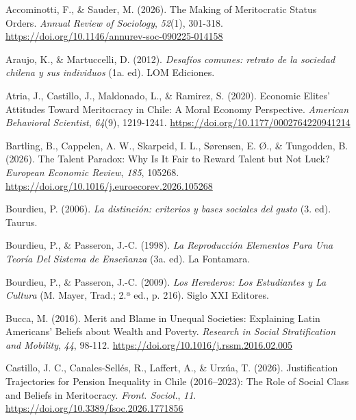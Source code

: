 \documentclass[
  spanish,
  a4paper,
  oneside]{scrbook}
\newlength{\cslhangindent}
\newenvironment{CSLReferences}[2] %
 {\begin{list}{}{%
  \setlength{\itemindent}{0pt}
  \setlength{\leftmargin}{0pt}
  \setlength{\parsep}{0pt}
  \ifodd #1
   \setlength{\leftmargin}{\cslhangindent}
   \setlength{\itemindent}{-1\cslhangindent}
  \fi
  \setlength{\itemsep}{#2\baselineskip}}}
 {\end{list}}
\begin{document}
\protect{}\label{refs}
\begin{CSLReferences}{1}{0}
Accominotti, F., \& Sauder, M. (2026). The {Making} of {Meritocratic
Status Orders}. \emph{Annual Review of Sociology}, \emph{52}(1),
301-318. \url{https://doi.org/10.1146/annurev-soc-090225-014158}

Araujo, K., \& Martuccelli, D. (2012). \emph{{Desafíos comunes: retrato
de la sociedad chilena y sus individuos}} (1a. ed). LOM Ediciones.

Atria, J., Castillo, J., Maldonado, L., \& Ramirez, S. (2020). Economic
{Elites}' {Attitudes Toward Meritocracy} in {Chile}: {A Moral Economy
Perspective}. \emph{American Behavioral Scientist}, \emph{64}(9),
1219-1241. \url{https://doi.org/10.1177/0002764220941214}

Bartling, B., Cappelen, A. W., Skarpeid, I. L., Sørensen, E. Ø., \&
Tungodden, B. (2026). The Talent Paradox: {Why} Is It Fair to Reward
Talent but Not Luck? \emph{European Economic Review}, \emph{185},
105268. \url{https://doi.org/10.1016/j.euroecorev.2026.105268}

Bourdieu, P. (2006). \emph{{La distinción: criterios y bases sociales
del gusto}} (3. ed). Taurus.

Bourdieu, P., \& Passeron, J.-C. (1998). \emph{La Reproducción Elementos
Para Una Teoría Del Sistema de Enseñanza} (3a. ed). La Fontamara.

Bourdieu, P., \& Passeron, J.-C. (2009). \emph{Los Herederos: Los
Estudiantes y La Cultura} (M. Mayer, Trad.; 2.ª ed., p. 216). Siglo XXI
Editores.

Bucca, M. (2016). Merit and Blame in Unequal Societies: {Explaining
Latin Americans}' Beliefs about Wealth and Poverty. \emph{Research in
Social Stratification and Mobility}, \emph{44}, 98-112.
\url{https://doi.org/10.1016/j.rssm.2016.02.005}

Castillo, J. C., Canales-Sellés, R., Laffert, A., \& Urzúa, T. (2026).
Justification Trajectories for Pension Inequality in {Chile}
(2016--2023): The Role of Social Class and Beliefs in Meritocracy.
\emph{Front. Sociol.}, \emph{11}.
\url{https://doi.org/10.3389/fsoc.2026.1771856}


\end{CSLReferences}
\end{document}
